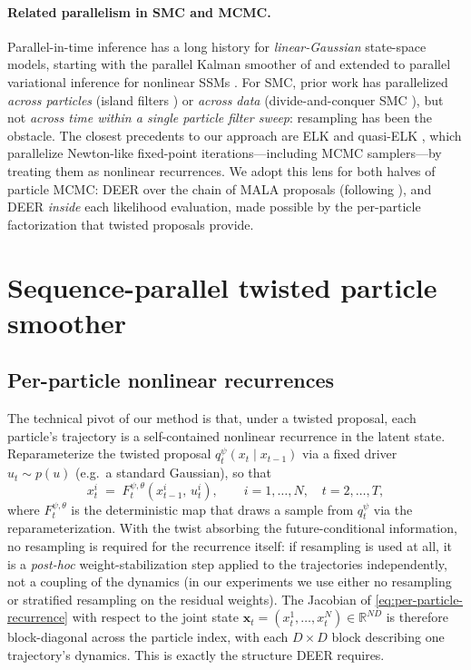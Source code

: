 \documentclass{article}
\begin{document}
\paragraph{Related parallelism in SMC and MCMC.} Parallel-in-time inference has a long history for \emph{linear-Gaussian} state-space models, starting with the parallel Kalman smoother of \citet{sarkka2021temporal} and extended to parallel variational inference for nonlinear SSMs \citep{hassan2022parallel}. For SMC, prior work has parallelized \emph{across particles} (island filters \citep{verge2015parallel}) or \emph{across data} (divide-and-conquer SMC \citep{lindsten2017divide}), but not \emph{across time within a single particle filter sweep}: resampling has been the obstacle. The closest precedents to our approach are ELK \citep{lim2024parallelizing} and quasi-ELK \citep{gonzalez2024towards}, which parallelize Newton-like fixed-point iterations---including MCMC samplers---by treating them as nonlinear recurrences. We adopt this lens for both halves of particle MCMC: DEER over the chain of MALA proposals (following \citet{gonzalez2024towards}), and DEER \emph{inside} each likelihood evaluation, made possible by the per-particle factorization that twisted proposals provide.

\section{Sequence-parallel twisted particle smoother}
\label{sec:method-pf}

\subsection{Per-particle nonlinear recurrences}
The technical pivot of our method is that, under a twisted proposal, each particle's trajectory is a self-contained nonlinear recurrence in the latent state. Reparameterize the twisted proposal $q_t^\psi(x_t \mid x_{t-1})$ via a fixed driver $u_t \sim p(u)$ (e.g.\ a standard Gaussian), so that
\begin{equation}
    x_t^{i} \;=\; F_t^{\psi,\theta}\!\left(x_{t-1}^{i},\, u_t^{i}\right), \qquad i = 1, \ldots, N, \quad t = 2, \ldots, T,
    \label{eq:per-particle-recurrence}
\end{equation}
where $F_t^{\psi,\theta}$ is the deterministic map that draws a sample from $q_t^\psi$ via the reparameterization. With the twist absorbing the future-conditional information, no resampling is required for the recurrence itself: if resampling is used at all, it is a \emph{post-hoc} weight-stabilization step applied to the trajectories independently, not a coupling of the dynamics (in our experiments we use either no resampling or stratified resampling on the residual weights). The Jacobian of \eqref{eq:per-particle-recurrence} with respect to the joint state $\mathbf{x}_t = (x_t^1, \ldots, x_t^N) \in \mathbb{R}^{ND}$ is therefore block-diagonal across the particle index, with each $D \times D$ block describing one trajectory's dynamics. This is exactly the structure DEER requires.
\end{document}
